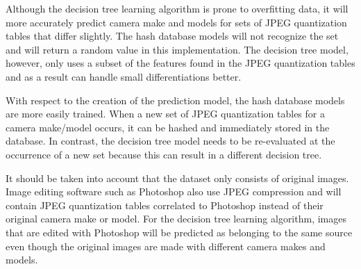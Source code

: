 Although the decision tree learning algorithm is prone to overfitting data, it will more accurately predict camera make and models for sets of JPEG quantization tables that differ slightly. The hash database models will not recognize the set and will return a random value in this implementation. The decision tree model, however, only uses a subset of the features found in the JPEG quantization tables and as a result can handle small differentiations better.

With respect to the creation of the prediction model, the hash database models are more easily trained. When a new set of JPEG quantization tables for a camera make/model occurs, it can be hashed and immediately stored in the database. In contrast, the decision tree model needs to be re-evaluated at the occurrence of a new set because this can result in a different decision tree.

It should be taken into account that the dataset only consists of original images. Image editing software such as Photoshop also use JPEG compression and will contain JPEG quantization tables correlated to Photoshop instead of their original camera make or model. For the decision tree learning algorithm, images that are edited with Photoshop will be predicted as belonging to the same source even though the original images are made with different camera makes and models. 

